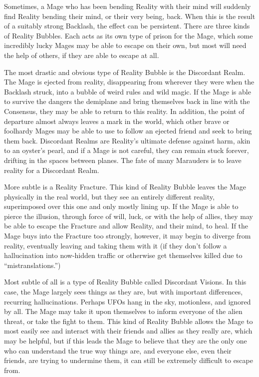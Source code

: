 \documentclass[letterpaper,12pt]{article}
\newcommand{\SECTION}[1]{\vspace{.5em}{\noindent\titlefont\large\textbf{#1}}

}
\begin{document}
\SECTION{Reality Bubbles}
Sometimes, a Mage who has been bending Reality with their mind will
suddenly find Reality bending their mind, or their very being,
back. When this is the result of a suitably strong Backlash, the
effect can be persistent. There are three kinds of Reality
Bubbles. Each acts as its own type of prison for the Mage, which some
incredibly lucky Mages may be able to escape on their own, but most
will need the help of others, if they are able to escape at all.

The most drastic and obvious type of Reality Bubble is the Discordant
Realm. The Mage is ejected from reality, disappearing from wherever
they were when the Backlash struck, into a bubble of weird rules and
wild magic. If the Mage is able to survive the dangers the demiplane
and bring themselves back in line with the Consensus, they may be able
to return to this reality. In addition, the point of departure almost
always leaves a mark in the world, which other brave or foolhardy
Mages may be able to use to follow an ejected friend and seek to bring
them back. Discordant Realms are Reality's ultimate defense against
harm, akin to an oyster's pearl, and if a Mage is not careful, they
can remain stuck forever, drifting in the spaces between planes. The
fate of many Marauders is to leave reality for a Discordant Realm.

More subtle is a Reality Fracture. This kind of Reality Bubble leaves
the Mage physically in the real world, but they see an entirely
different reality, superimposed over this one and only mostly lining
up. If the Mage is able to pierce the illusion, through force of will,
luck, or with the help of allies, they may be able to escape the
Fracture and allow Reality, and their mind, to heal. If the Mage buys
into the Fracture too strongly, however, it may begin to diverge from
reality, eventually leaving and taking them with it (if they don't
follow a hallucination into now-hidden traffic or otherwise get
themselves killed due to ``mistranslations.'')

Most subtle of all is a type of Reality Bubble called Discordant
Visions. In this case, the Mage largely sees things as they are, but
with important differences, recurring hallucinations. Perhaps UFOs
hang in the sky, motionless, and ignored by all. The Mage may take it
upon themselves to inform everyone of the alien threat, or take the
fight to them. This kind of Reality Bubble allows the Mage to most
easily see and interact with their friends and allies as they really
are, which may be helpful, but if this leads the Mage to believe that
they are the only one who can understand the true way things are, and
everyone else, even their friends, are trying to undermine
them, it can still be extremely difficult to escape from.
\end{document}
